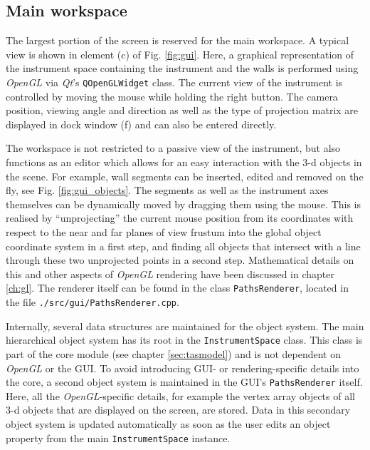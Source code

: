 \subsection{Main workspace}
\label{sec:gui_gl}
The largest portion of the screen is reserved for the main workspace.
A typical view is shown in element (c) of Fig. \ref{fig:gui}.
Here, a graphical representation of the instrument space containing the instrument and the walls 
is performed using \textit{OpenGL} \cite{web_OpenGL} via \textit{Qt}'s
\lstinline[language=C++]|QOpenGLWidget| \cite{web_QOpenGLWidget} class.
The current view of the instrument is controlled by moving the mouse while holding the right button.
The camera position, viewing angle and direction as well as the type of projection matrix are 
displayed in dock window (f) and can also be entered directly.

The workspace is not restricted to a passive view of the instrument, but also functions as an editor
which allows for an easy interaction with the 3-d objects in the scene. For example, wall segments can
be inserted, edited and removed on the fly, see Fig. \ref{fig:gui_objects}.
The segments as well as the instrument axes themselves can be dynamically moved by dragging them using the 
mouse. This is realised by ``unprojecting'' the current mouse position from its coordinates with respect 
to the near and far planes of view frustum into the global object coordinate system in a first step, 
and finding all objects that intersect with a line through these two unprojected points in a second step. 
Mathematical details on this and other aspects of \textit{OpenGL} rendering have been discussed 
in chapter \ref{ch:gl}.
The renderer itself can be found in the class \lstinline[language=C++]|PathsRenderer|, located in
the file \lstinline|./src/gui/PathsRenderer.cpp|.

Internally, several data structures are maintained for the object system. 
The main hierarchical object system has its root in the \lstinline[language=C++]|InstrumentSpace|
class. This class is part of the core module (see chapter \ref{sec:tasmodel}) and is not dependent
on \textit{OpenGL} or the GUI.
To avoid introducing GUI- or rendering-specific details into the core, a second object
system is maintained in the GUI's \lstinline[language=C++]|PathsRenderer| itself. 
Here, all the \textit{OpenGL}-specific details, for example the vertex array objects \cite{wiki_vao} 
of all 3-d objects that are displayed on the screen, are stored.
Data in this secondary object system is updated automatically as soon as the user edits an object 
property from the main \lstinline[language=C++]|InstrumentSpace| instance.

